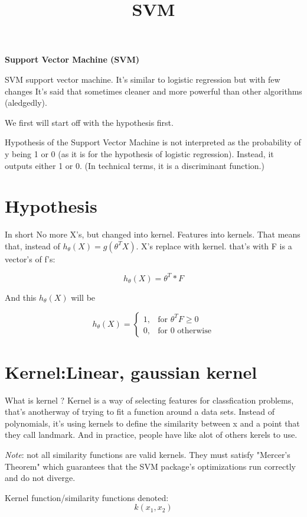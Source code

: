 \documentclass[30pt]{article}
\title{SVM}
\begin{document}
{\parindent0pt

{\Large \textbf{Support Vector Machine (SVM)} }

SVM support vector machine. It's similar to logistic regression but with few
changes It's said that sometimes cleaner and more powerful than other algorithms (aledgedly).

We first will start off with the hypothesis first.

Hypothesis of the Support Vector Machine is not
interpreted as the probability of y being 1 or 0 (as it is for the hypothesis
of logistic regression). Instead, it outputs either 1 or 0. (In technical
terms, it is a discriminant function.)

\section{Hypothesis}
In short No more X's, but changed into kernel. Features into kernels. That means that,
instead of $h_{\theta}(X) = g(\theta^T X)$. X's replace with kernel. that's with 
F is a vector's of f's:

\begin{equation}
	h_\theta(X)  = \theta^T*F
\end{equation}

And this $h_{\theta}(X)$ will be

\[
	h_{\theta}(X) = \left.
	\begin{cases}
		1,  & \text{for } \theta^TF \geq 0 \\
		0,  & \text{for } 0 \text{ otherwise}
	\end{cases}
	\right.
\]

\section{Kernel:Linear, gaussian kernel}

What is kernel ? Kernel is a way of selecting features for classfication problems, that's
anotherway of trying to fit a function around a data sets. Instead of polynomials, it's
using kernels to define the similarity between x and a point that they call landmark.
And in practice, people have like alot of others kerels to use. 

\textit{Note}: not all similarity functions are valid kernels. They must satisfy "Mercer's Theorem" which guarantees that the SVM package's optimizations run correctly and do not diverge.

Kernel function/similarity functions denoted: $$k(x_1,x_2)$$

}
\end{document}
